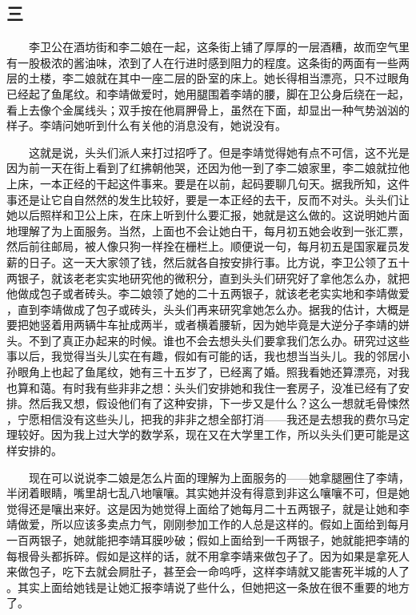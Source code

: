  
\subsection{三} 
 
 　　李卫公在酒坊街和李二娘在一起，这条街上铺了厚厚的一层酒糟，故而空气里 有一股极浓的酱油味，浓到了人在行进时感到阻力的程度。这条街的两面有一些两 层的土楼，李二娘就在其中一座二层的卧室的床上。她长得相当漂亮，只不过眼角 已经起了鱼尾纹。和李靖做爱时，她用腿围着李靖的腰，脚在卫公身后绕在一起， 看上去像个金属线头；双手按在他肩胛骨上，虽然在下面，却显出一种气势汹汹的 样子。李靖问她听到什么有关他的消息没有，她说没有。

 　　这就是说，头头们派人来打过招呼了。但是李靖觉得她有点不可信，这不光是 因为前一天在街上看到了红拂朝他哭，还因为他一到了李二娘家里，李二娘就拉他 上床，一本正经的干起这件事来。要是在以前，起码要聊几句天。据我所知，这件 事还是让它自自然然的发生比较好，要是一本正经的去干，反而不对头。头头们让 她以后照样和卫公上床，在床上听到什么要汇报，她就是这么做的。这说明她片面 地理解了为上面服务。当然，上面也不会让她白干，每月初五她会收到一张汇票， 然后前往邮局，被人像只狗一样拴在栅栏上。顺便说一句，每月初五是国家雇员发 薪的日子。这一天大家领了钱，然后就各自按安排行事。比方说，李卫公领了五十 两银子，就该老老实实地研究他的微积分，直到头头们研究好了拿他怎么办，就把 他做成包子或者砖头。李二娘领了她的二十五两银子，就该老老实实地和李靖做爱 ，直到李靖做成了包子或砖头，头头们再来研究拿她怎么办。据我的估计，大概是 要把她竖着用两辆牛车扯成两半，或者横着腰斩，因为她毕竟是大逆分子李靖的姘 头。不到了真正办起来的时候。谁也不会去想头头们要拿我们怎么办。研究过这些 事以后，我觉得当头儿实在有趣，假如有可能的话，我也想当当头儿。我的邻居小 孙眼角上也起了鱼尾纹，她有三十五岁了，已经离了婚。照我看她还算漂亮，对我 也算和蔼。有时我有些非非之想：头头们安排她和我住一套房子，没准已经有了安 排。然后我又想，假设他们有了这种安排，下一步又是什么？这么一想就毛骨悚然 ，宁愿相信没有这些头儿，把我的非非之想全部打消——我还是去想我的费尔马定 理较好。因为我上过大学的数学系，现在又在大学里工作，所以头头们更可能是这 样安排的。 

　　现在可以说说李二娘是怎么片面的理解为上面服务的——她拿腿圈住了李靖， 半闭着眼睛，嘴里胡七乱八地嚷嚷。其实她并没有得意到非这么嚷嚷不可，但是她 觉得还是嚷出来好。这是因为她觉得上面给了她每月二十五两银子，就是让她和李 靖做爱，所以应该多卖点力气，刚刚参加工作的人总是这样的。假如上面给到每月 一百两银子，她就能把李靖耳膜吵破；假如上面给到一千两银子，她就能把李靖的 每根骨头都拆碎。假如是这样的话，就不用拿李靖来做包子了。因为如果是拿死人 来做包子，吃下去就会屙肚子，甚至会一命呜呼，这样李靖就又能害死半城的人了 。其实上面给她钱是让她汇报李靖说了些什么，但她把这一条放在很不重要的地方 了。 


